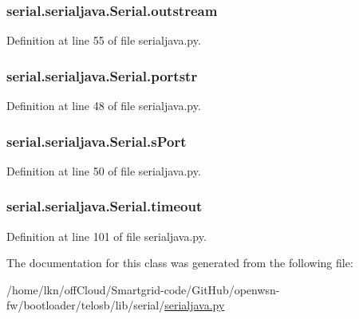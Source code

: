 \subsubsection[{\texorpdfstring{outstream}{outstream}}]{\setlength{\rightskip}{0pt plus 5cm}serial.\+serialjava.\+Serial.\+outstream}\hypertarget{classserial_1_1serialjava_1_1_serial_ae3abd44d3b3cdc04e372272c37a9f835}{}\label{classserial_1_1serialjava_1_1_serial_ae3abd44d3b3cdc04e372272c37a9f835}


Definition at line 55 of file serialjava.\+py.

\subsubsection[{\texorpdfstring{portstr}{portstr}}]{\setlength{\rightskip}{0pt plus 5cm}serial.\+serialjava.\+Serial.\+portstr}\hypertarget{classserial_1_1serialjava_1_1_serial_ab6498afad653a048b71bf6acfa28b9fa}{}\label{classserial_1_1serialjava_1_1_serial_ab6498afad653a048b71bf6acfa28b9fa}


Definition at line 48 of file serialjava.\+py.

\subsubsection[{\texorpdfstring{s\+Port}{sPort}}]{\setlength{\rightskip}{0pt plus 5cm}serial.\+serialjava.\+Serial.\+s\+Port}\hypertarget{classserial_1_1serialjava_1_1_serial_aaa1990322f62a49afb17fa9dbc0768f2}{}\label{classserial_1_1serialjava_1_1_serial_aaa1990322f62a49afb17fa9dbc0768f2}


Definition at line 50 of file serialjava.\+py.

\subsubsection[{\texorpdfstring{timeout}{timeout}}]{\setlength{\rightskip}{0pt plus 5cm}serial.\+serialjava.\+Serial.\+timeout}\hypertarget{classserial_1_1serialjava_1_1_serial_a41c3f66d51a2ea75cb784ed93d23db46}{}\label{classserial_1_1serialjava_1_1_serial_a41c3f66d51a2ea75cb784ed93d23db46}


Definition at line 101 of file serialjava.\+py.



The documentation for this class was generated from the following file\+:\begin{DoxyCompactItemize}
\item 
/home/lkn/off\+Cloud/\+Smartgrid-\/code/\+Git\+Hub/openwsn-\/fw/bootloader/telosb/lib/serial/\hyperlink{serialjava_8py}{serialjava.\+py}\end{DoxyCompactItemize}
